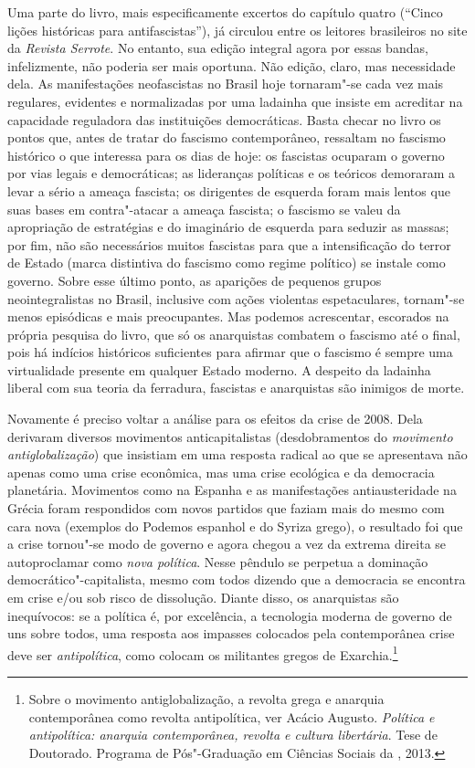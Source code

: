 Uma parte do livro, mais especificamente excertos do capítulo quatro
(``Cinco lições históricas para antifascistas''), já circulou entre os
leitores brasileiros no site da \emph{Revista Serrote}. No entanto, sua edição
integral agora por essas bandas, infelizmente, não poderia ser mais
oportuna. Não edição, claro, mas necessidade dela. As manifestações
neofascistas no Brasil hoje tornaram"-se cada vez mais regulares,
evidentes e normalizadas por uma ladainha que insiste em acreditar na
capacidade reguladora das instituições democráticas. Basta checar no
livro os pontos que, antes de tratar do fascismo contemporâneo,
ressaltam no fascismo histórico o que interessa para os dias de hoje: os
fascistas ocuparam o governo por vias legais e democráticas; as
lideranças políticas e os teóricos demoraram a levar a sério a ameaça
fascista; os dirigentes de esquerda foram mais lentos que suas bases em
contra"-atacar a ameaça fascista; o fascismo se valeu da apropriação de
estratégias e do imaginário de esquerda para seduzir as massas; por fim,
não são necessários muitos fascistas para que a intensificação do terror
de Estado (marca distintiva do fascismo como regime político) se instale
como governo. Sobre esse último ponto, as aparições de pequenos grupos
neointegralistas no Brasil, inclusive com ações violentas espetaculares,
tornam"-se menos episódicas e mais preocupantes. Mas podemos acrescentar,
escorados na própria pesquisa do livro, que só os anarquistas combatem o
fascismo até o final, pois há indícios históricos suficientes para
afirmar que o fascismo é sempre uma virtualidade presente em qualquer
Estado moderno. A despeito da ladainha liberal com sua teoria da
ferradura, fascistas e anarquistas são inimigos de morte.

Novamente é preciso voltar a análise para os efeitos da crise de 2008.
Dela derivaram diversos movimentos anticapitalistas (desdobramentos do
\emph{movimento antiglobalização}) que insistiam em uma resposta radical
ao que se apresentava não apenas como uma crise econômica, mas uma crise
ecológica e da democracia planetária. Movimentos como  na Espanha e
as manifestações antiausteridade na Grécia foram respondidos com novos
partidos que faziam mais do mesmo com cara nova (exemplos do Podemos
espanhol e do Syriza grego), o resultado foi que a crise tornou"-se modo
de governo e agora chegou a vez da extrema direita se autoproclamar como
\emph{nova política}. Nesse pêndulo se perpetua a dominação
democrático"-capitalista, mesmo com todos dizendo que a democracia se
encontra em crise e/ou sob risco de dissolução. Diante disso, os
anarquistas são inequívocos: se a política é, por excelência, a
tecnologia moderna de governo de uns sobre todos, uma resposta aos
impasses colocados pela contemporânea crise deve ser
\emph{antipolítica}, como colocam os militantes gregos de
Exarchia.\footnote{Sobre o movimento antiglobalização, a revolta grega e
  anarquia contemporânea como revolta antipolítica, ver Acácio Augusto.
  \emph{Política e antipolítica: anarquia contemporânea, revolta e
  cultura libertária}. Tese de Doutorado. Programa de Pós"-Graduação em
  Ciências Sociais da , 2013.}

